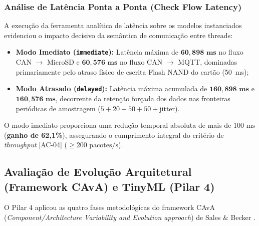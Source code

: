 \subsubsection{Análise de Latência Ponta a Ponta (Check Flow Latency)}
A execução da ferramenta analítica de latência sobre os modelos instanciados evidenciou o impacto decisivo da semântica de comunicação entre threads:
\begin{itemize}
    \item \textbf{Modo Imediato (\texttt{immediate}):} Latência máxima de $\mathbf{60{,}898\text{ ms}}$ no fluxo CAN $\to$ MicroSD e $\mathbf{60{,}576\text{ ms}}$ no fluxo CAN $\to$ MQTT, dominadas primariamente pelo atraso físico de escrita Flash NAND do cartão (50~ms);
    \item \textbf{Modo Atrasado (\texttt{delayed}):} Latência máxima acumulada de $\mathbf{160{,}898\text{ ms}}$ e $\mathbf{160{,}576\text{ ms}}$, decorrente da retenção forçada dos dados nas fronteiras periódicas de amostragem ($5 + 20 + 50 + 50 + \text{jitter}$).
\end{itemize}

O modo imediato proporciona uma redução temporal absoluta de mais de $100\text{ ms}$ (\textbf{ganho de 62{,}1\%}), assegurando o cumprimento integral do critério de \textit{throughput} [AC-04] ($\ge 200\text{ pacotes/s}$).



\subsection{Avaliação de Evolução Arquitetural (Framework CAvA) e TinyML (Pilar 4)}
\label{subsec:pilar4_detalhe}

O Pilar 4 aplicou as quatro fases metodológicas do framework CAvA (\textit{Component/Architecture Variability and Evolution approach}) de Sales \& Becker \cite{sales2018cava}.


